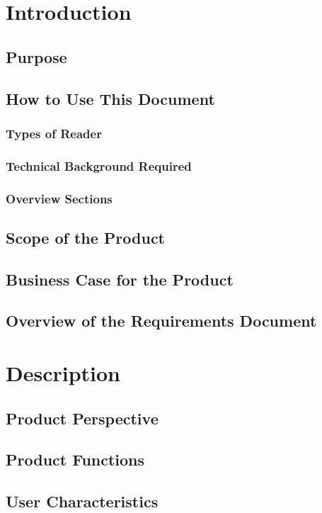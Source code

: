 \documentclass[oneside,12pt]{scrbook}
\begin{document}


\tableofcontents

\chapter{Introduction}
\section{Purpose}
\section{How to Use This Document}
\subsection{Types of Reader}
\subsection{Technical Background Required}
\subsection{Overview Sections}
\section{Scope of the Product}
\section{Business Case for the Product}
\section{Overview of the Requirements Document}

\chapter{Description}
\section{Product Perspective}
\section{Product Functions}
\section{User Characteristics}
\end{document}
